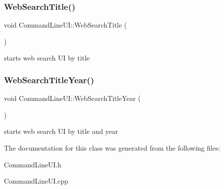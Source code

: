 \subsubsection{\texorpdfstring{Web\+Search\+Title()}{WebSearchTitle()}}
{\footnotesize\ttfamily void Command\+Line\+U\+I\+::\+Web\+Search\+Title (\begin{DoxyParamCaption}{ }\end{DoxyParamCaption})\hspace{0.3cm}{\ttfamily [static]}}

starts web search UI by title \mbox{\label{class_command_line_u_i_a9aadc77fe37d190f9a3931c7babac900}} 
\subsubsection{\texorpdfstring{Web\+Search\+Title\+Year()}{WebSearchTitleYear()}}
{\footnotesize\ttfamily void Command\+Line\+U\+I\+::\+Web\+Search\+Title\+Year (\begin{DoxyParamCaption}{ }\end{DoxyParamCaption})\hspace{0.3cm}{\ttfamily [static]}}

starts web search UI by title and year 

The documentation for this class was generated from the following files\+:\begin{DoxyCompactItemize}
\item 
Command\+Line\+U\+I.\+h\item 
Command\+Line\+U\+I.\+cpp\end{DoxyCompactItemize}
